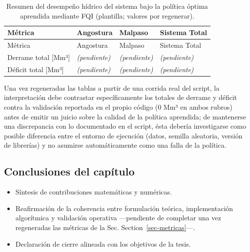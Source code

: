\documentclass[
  letterpaper,
  DIV=11,
  numbers=noendperiod]{scrreprt}
\providecommand{\tightlist}{%
  \setlength{\itemsep}{0pt}\setlength{\parskip}{0pt}}
\theoremstyle{definition}
\theoremstyle{remark}
\begin{document}
\begin{longtable}[]{@{}llll@{}}
\caption{Resumen del desempeño hídrico del sistema bajo la política
óptima aprendida mediante FQI (plantilla; valores por
regenerar).}\label{tbl-desempeno-hidrico}\tabularnewline
\toprule\noalign{}
Métrica & Angostura & Malpaso & Sistema Total \\
\midrule\noalign{}
\endfirsthead
\toprule\noalign{}
Métrica & Angostura & Malpaso & Sistema Total \\
\midrule\noalign{}
\endhead
\bottomrule\noalign{}
\endlastfoot
Derrame total {[}Mm³{]} & \emph{(pendiente)} & \emph{(pendiente)} &
\emph{(pendiente)} \\
Déficit total {[}Mm³{]} & \emph{(pendiente)} & \emph{(pendiente)} &
\emph{(pendiente)} \\
\end{longtable}

Una vez regeneradas las tablas a partir de una corrida real del script,
la interpretación debe contrastar específicamente los totales de derrame
y déficit contra la validación reportada en el propio código (0 Mm³ en
ambos rubros) antes de emitir un juicio sobre la calidad de la política
aprendida; de mantenerse una discrepancia con lo documentado en el
script, ésta debería investigarse como posible diferencia entre el
entorno de ejecución (datos, semilla aleatoria, versión de librerías) y
no asumirse automáticamente como una falla de la política.

\section{Conclusiones del
capítulo}\label{conclusiones-del-capuxedtulo-1}

\begin{itemize}
\tightlist
\item
  Síntesis de contribuciones matemáticas y numéricas.
\item
  Reafirmación de la coherencia entre formulación teórica,
  implementación algorítmica y validación operativa ---pendiente de
  completar una vez regeneradas las métricas de la Sec.
  Section~\ref{sec-metricas}---.
\item
  Declaración de cierre alineada con los objetivos de la tesis.
\end{itemize}


\chapter{}\label{section}
\end{document}
